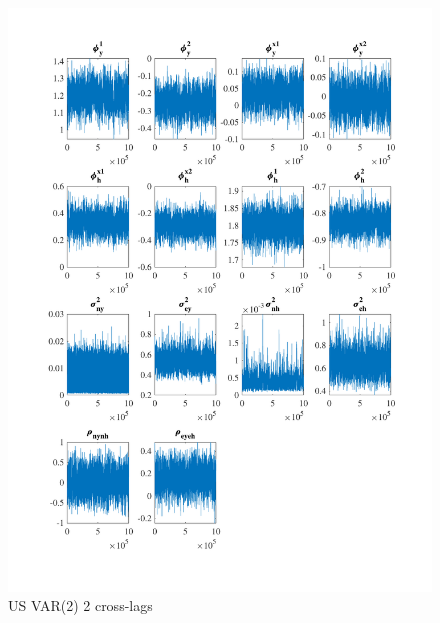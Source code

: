 \documentclass[
  12pt,
]{article}
\begin{document}
\begin{figure}

{\centering \includegraphics[width=0.85\linewidth]{../../Regression/Bayesian_UC_VAR2_drift_Crosscycle2lags/OutputData/posteriorchain_US} 

}

\caption{US VAR(2) 2 cross-lags}\label{fig:unnamed-chunk-20}
\end{figure}
\end{document}

